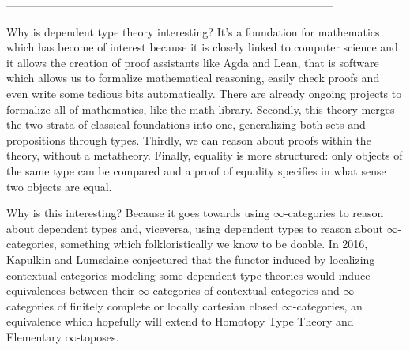 \documentclass{minimal}
\begin{document}
\noindent
-----------------------------------------------------------------------------------------

Why is dependent type theory interesting? It's a foundation for mathematics
which has become of interest because it is closely linked to computer science
and it allows the creation of proof assistants like Agda and Lean, that is
software which allows us to formalize mathematical reasoning, easily check
proofs and even write some tedious bits automatically. There are already ongoing
projects to formalize all of mathematics, like the math library. Secondly, this
theory merges the two strata of classical foundations into one, generalizing
both sets and propositions through types. Thirdly, we can reason about proofs
within the theory, without a metatheory. Finally, equality is more structured:
only objects of the same type can be compared and a proof of equality specifies
in what sense two objects are equal.

Why is this interesting? Because it goes towards using $\infty$-categories to
reason about dependent types and, viceversa, using dependent types to reason
about $\infty$-categories, something which folkloristically we know to be
doable. In 2016, Kapulkin and Lumsdaine conjectured that the functor induced by
localizing contextual categories modeling some dependent type theories
would induce equivalences between their $\infty$-categories of contextual
categories and $\infty$-categories of finitely complete or locally cartesian
closed $\infty$-categories, an equivalence which hopefully will extend to
Homotopy Type Theory and Elementary $\infty$-toposes.
\end{document}
